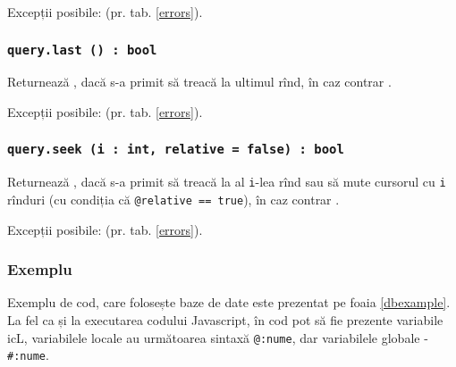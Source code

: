 Excepții posibile:  (pr. tab. \ref{errors}).

\subsubsection{\texttt{query.last () : bool}}

Returnează \true, dacă s-a primit să treacă la ultimul rînd, în caz contrar \false.

Excepții posibile:  (pr. tab. \ref{errors}).

\subsubsection{\texttt{query.seek (i : int, relative = false) : bool}}

Returnează \true, dacă s-a primit să treacă la al \texttt{i}-lea rînd sau să mute cursorul cu \texttt{i} rînduri (cu condiția că \texttt{@relative == true}), în caz contrar \false.

Excepții posibile:  (pr. tab. \ref{errors}).

\subsubsection{Exemplu}

Exemplu de cod, care folosește baze de date este prezentat pe foaia \ref{dbexample}. La fel ca și la executarea codului Javascript, în cod pot să fie prezente variabile icL, variabilele locale au următoarea sintaxă \texttt{@:nume}, dar variabilele globale - \texttt{#:nume}.

\newpage
\begin{sourcecode}
    \label{dbexample}
    \inputminted[linenos]{icl}{../sources/dbexample.icL}
\end{sourcecode}

